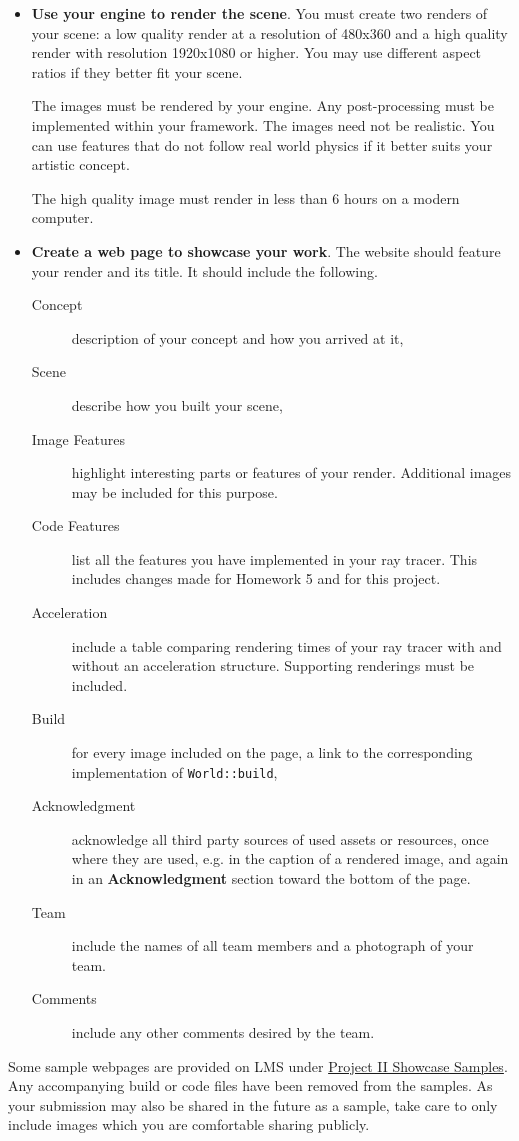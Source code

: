 \documentclass[addpoints]{exam}
\begin{document}
\begin{questions}
\begin{itemize}
  \item \textbf{Use your engine to render the scene}. You must create two renders of your scene: a low quality render at a resolution of 480x360 and a high quality render with resolution 1920x1080 or higher. You may use different aspect ratios if they better fit your scene.
    
    The images must be rendered by your engine. Any post-processing must be implemented within your framework. The images need not be realistic. You can use features that do not follow real world physics if it better suits your artistic concept.
    
    The high quality image must render in less than 6 hours on a modern computer.

  \item \textbf{Create a web page to showcase your work}. The website should feature your render and its title. It should include the following.
    \begin{description}
    \item[Concept] description of your concept and how you arrived at it,
    \item[Scene] describe how you built your scene,
    \item[Image Features] highlight interesting parts or features of your render. Additional images may be included for this purpose.
    \item[Code Features] list all the features you have implemented in your ray tracer. This includes changes made for Homework 5 and for this project.
    \item[Acceleration] include a table comparing rendering times of your ray tracer with and without an acceleration structure. Supporting renderings must be included.
    \item[Build] for every image included on the page, a link to the corresponding implementation of {\tt World::build},
    \item[Acknowledgment] acknowledge all third party sources of used assets or resources, once where they are used, e.g. in the caption of a rendered image, and again in an \textbf{Acknowledgment} section toward the bottom of the page.
    \item[Team] include the names of all team members and a photograph of your team.
    \item[Comments] include any other comments desired by the team.
    \end{description}
  \end{itemize}

  Some sample webpages are provided on LMS under \href{https://hulms.instructure.com/courses/332/files/66380/download?download_frd=1}{Project II Showcase Samples}. Any accompanying build or code files have been removed from the samples. As your submission may also be shared in the future as a sample, take care to only include images which you are comfortable sharing publicly.
  
\end{questions}
\end{document}
